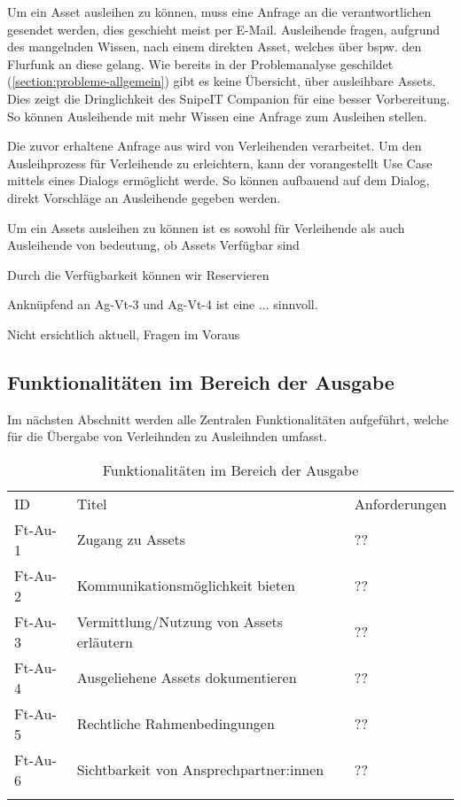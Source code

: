 \label{subsubsection:Ag-Vt-1}
Um ein Asset ausleihen zu können, muss eine Anfrage an die verantwortlichen gesendet werden, dies
geschieht meist per E-Mail. Ausleihende fragen, aufgrund des mangelnden Wissen, nach einem direkten
Asset, welches über bspw. den Flurfunk an diese gelang. Wie bereits in der Problemanalyse geschildet
(\ref{section:probleme-allgemein}) gibt es keine Übersicht, über ausleihbare Assets. Dies zeigt die
Dringlichkeit des SnipeIT Companion für eine besser Vorbereitung. So können Ausleihende mit mehr
Wissen eine Anfrage zum Ausleihen stellen. 

Die zuvor erhaltene Anfrage aus  wird von Verleihenden verarbeitet.
Um den Ausleihprozess für Verleihende zu erleichtern, kann der vorangestellt Use Case mittels eines
Dialogs ermöglicht werde. So können aufbauend auf dem Dialog, direkt Vorschläge an Ausleihende gegeben
werden.

Um ein Assets ausleihen zu können ist es sowohl für Verleihende als auch Ausleihende von bedeutung,
ob Assets Verfügbar sind

Durch die Verfügbarkeit können wir Reservieren

Anknüpfend an Ag-Vt-3 und Ag-Vt-4 ist eine ... sinnvoll.

Nicht ersichtlich aktuell, Fragen im Voraus 

\subsection{Funktionalitäten im Bereich der Ausgabe}
Im nächsten Abschnitt werden alle Zentralen Funktionalitäten aufgeführt, welche für die Übergabe von
Verleihnden zu Ausleihnden umfasst.
\begin{table}[h]
    \centering
    \caption{Funktionalitäten im Bereich der Ausgabe}
    \begin{tabular}{lll}
            \arrayrulecolor{maincolor}\hline
            \sffamily\color{maincolor}ID & \sffamily\color{maincolor}Titel &
            \sffamily\color{maincolor}Anforderungen \\
            \arrayrulecolor{maincolor}\hline
            Ft-Au-1 & Zugang zu Assets                              & ?? \\
            Ft-Au-2 & Kommunikationsmöglichkeit bieten              & ?? \\
            Ft-Au-3 & Vermittlung/Nutzung von Assets erläutern      & ?? \\
            Ft-Au-4 & Ausgeliehene Assets dokumentieren             & ?? \\
            Ft-Au-5 & Rechtliche Rahmenbedingungen                  & ?? \\
            Ft-Au-6 & Sichtbarkeit von Ansprechpartner:innen        & ?? \\
            \arrayrulecolor{maincolor}\hline
    \end{tabular}
    \label{table:ft-Au}
\end{table}


